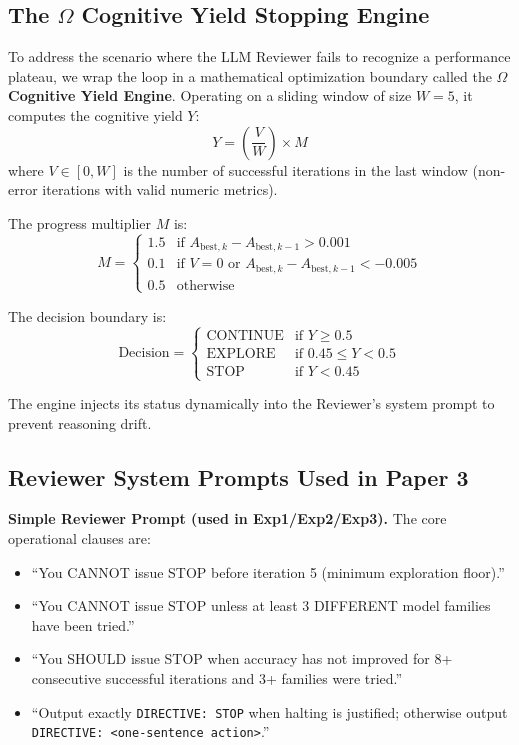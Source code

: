 \documentclass[11pt,a4paper]{article}
\begin{document}
\subsection{The \texorpdfstring{$\Omega$}{Omega} Cognitive Yield Stopping Engine}

To address the scenario where the LLM Reviewer fails to recognize a performance plateau, we wrap the loop in a mathematical optimization boundary called the \textbf{$\Omega$ Cognitive Yield Engine}. Operating on a sliding window of size $W=5$, it computes the cognitive yield $Y$:
\begin{equation}
    Y = \left(\frac{V}{W}\right) \times M
\end{equation}
where $V \in [0, W]$ is the number of successful iterations in the last window (non-error iterations with valid numeric metrics).

The progress multiplier $M$ is:
\begin{equation}
    M = \begin{cases}
        1.5 & \text{if } A_{\text{best}, k} - A_{\text{best}, k-1} > 0.001 \\
        0.1 & \text{if } V = 0 \text{ or } A_{\text{best}, k} - A_{\text{best}, k-1} < -0.005 \\
        0.5 & \text{otherwise}
    \end{cases}
\end{equation}

The decision boundary is:
\begin{equation}
    \text{Decision} = \begin{cases}
        \text{CONTINUE} & \text{if } Y \ge 0.5 \\
        \text{EXPLORE} & \text{if } 0.45 \le Y < 0.5 \\
        \text{STOP} & \text{if } Y < 0.45
    \end{cases}
\end{equation}

The engine injects its status dynamically into the Reviewer's system prompt to prevent reasoning drift.

\subsection{Reviewer System Prompts Used in Paper 3}

\textbf{Simple Reviewer Prompt (used in Exp1/Exp2/Exp3).} The core operational clauses are:
\begin{itemize}
    \item ``You CANNOT issue STOP before iteration 5 (minimum exploration floor).''
    \item ``You CANNOT issue STOP unless at least 3 DIFFERENT model families have been tried.''
    \item ``You SHOULD issue STOP when accuracy has not improved for 8+ consecutive successful iterations and 3+ families were tried.''
    \item ``Output exactly \texttt{DIRECTIVE: STOP} when halting is justified; otherwise output \texttt{DIRECTIVE: <one-sentence action>}.''
\end{itemize}
\end{document}
